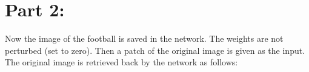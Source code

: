 \documentclass{article}
\begin{document}
\section{Part 2: }
Now the image of the football is saved in the network. The weights are not perturbed (set to zero). Then a patch of the original image is given as the input. The original image is retrieved back by the network as follows:
\begin{figure}[H]
\hspace{0.001\textwidth}
\end{figure}

\begin{figure}[H]
\hspace{0.001\textwidth}
\end{figure}
\end{document}
